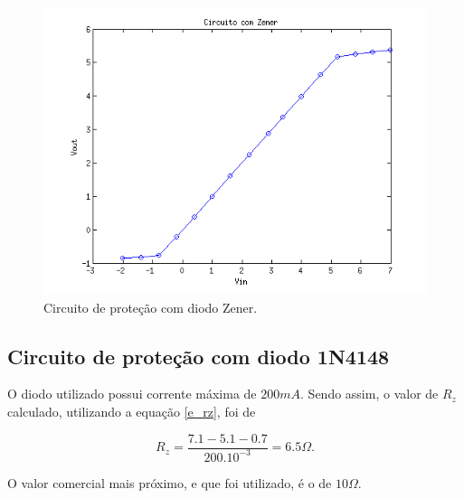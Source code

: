 \begin{figure}[H]
	\centering
	\includegraphics[scale=1]{img/plotzener.png}
	\caption{Circuito de proteção com diodo Zener.}
	\label{f_plotzener}
\end{figure}

\subsection{Circuito de proteção com diodo 1N4148}
O diodo utilizado possui corrente máxima de $200mA$. Sendo assim, o valor de $R_z$ calculado, utilizando a equação \ref{e_rz}, foi de

\[ R_z = \frac{7.1 - 5.1 - 0.7}{200.10^{-3}} = 6.5 \Omega.\]

O valor comercial mais próximo, e que foi utilizado, é o de $10\Omega$.

